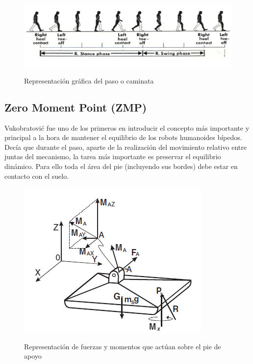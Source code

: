 
\begin{figure}[H]
\centering
{\includegraphics[scale=0.6]{imagenes/apartado_2/221_ciclo_paso_humano}}
\caption{Representación gráfica del paso o caminata}
\label{figura221}
\end{figure}

\newpage

\subsection{Zero Moment Point (ZMP)}

Vukobratović \cite{ref16} fue uno de los primeros en introducir el concepto más importante y principal a la hora de mantener el equilibrio de los robots humanoides bípedos. Decía que durante el paso, aparte de la realización del movimiento relativo entre juntas del mecanismo, la tarea más importante es preservar el equilibrio dinámico. Para ello toda el área del pie (incluyendo sus bordes) debe estar en contacto con el suelo.

\begin{figure}[H]
\centering
{\includegraphics[scale=0.6]{imagenes/apartado_2/222_fuerzas_momentos}}
\caption{Representación de fuerzas y momentos que actúan sobre el pie de apoyo}
\label{figura222}
\end{figure}

